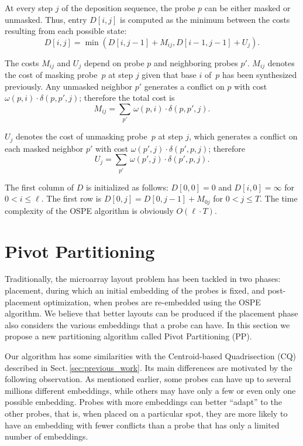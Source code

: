 \documentclass{llncs}
\begin{document}
At every step $j$ of the deposition sequence, the probe $p$ can be either
masked or unmasked. Thus, entry $D[i,j]$ is computed as the minimum between
the costs resulting from each possible state:
\[
D[i,j] = \min (D[i,j-1] + M_{ij}, D[i-1,j-1] + U_{j}).
\]

The costs $M_{ij}$ and $U_{j}$ depend on probe $p$ and neighboring probes $p'$.
$M_{ij}$ denotes the cost of masking probe~$p$ at step $j$ given that base $i$
of~$p$ has been synthesized previously. Any unmasked neighbor $p'$
generates a conflict on $p$ with cost $\omega(p,i)\cdot \delta(p,p',j)$;
therefore the total cost is
\[ M_{ij} = \sum_{p'}\, \omega(p,i) \cdot \delta(p,p',j). \]

$U_{j}$ denotes the cost of unmasking probe~$p$ at step $j$, which generates a
conflict on each masked neighbor $p'$ with cost $\omega(p',j)\cdot
\delta(p',p,j)$; therefore 
\[ U_j = \sum_{p'}\, \omega(p',j) \cdot \delta(p',p,j). \]

The first column of $D$ is initialized as follows: $D[0,0] = 0$ and $D[i,0] =
\infty$ for $0 < i \leq \ell$. The first row is $D[0,j] = D[0,j-1]+M_{0j}$ for
$0<j\leq T$.
The time complexity of the OSPE algorithm is obviously $O(\ell \cdot T)$.


\section{Pivot Partitioning}
\label{sec:pivotpart}

Traditionally, the microarray layout problem has been tackled in two phases:
placement, during which an initial embedding of the probes is fixed, and
post-placement optimization, when probes are re-embedded using the OSPE
algorithm.  We believe that better layouts can be produced if the placement
phase also considers the various embeddings that a probe can have. In this
section we propose a new partitioning algorithm called Pivot Partitioning
(PP).

Our algorithm has some similarities with the Centroid-based Quadrisection (CQ)
described in Sect.\,\ref{sec:previous_work}.  Its main differences are
motivated by the following observation.  As mentioned earlier, some probes can
have up to several millions different embeddings, while others may have only a
few or even only one possible embedding.  Probes with more embeddings can
better ``adapt'' to the other probes, that is, when placed on a particular
spot, they are more likely to have an embedding with fewer conflicts than a
probe that has only a limited number of embeddings.
\end{document}
